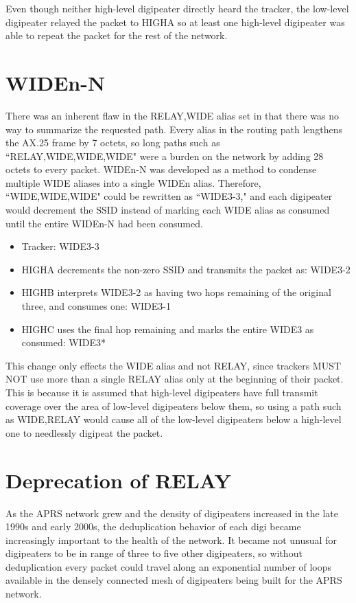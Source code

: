 Even though neither high-level digipeater directly heard the tracker,
the low-level digipeater relayed the packet to HIGHA so at least one high-level
digipeater was able to repeat the packet for the rest of the network.

\section{WIDEn-N}

There was an inherent flaw in the RELAY,WIDE alias set
in that there was no way to summarize the requested path.
Every alias in the routing path lengthens the AX.25 frame by 7 octets,
so long paths such as ``RELAY,WIDE,WIDE,WIDE" were a burden on the network
by adding 28 octets to every packet.
WIDEn-N was developed as a method to condense multiple WIDE aliases into a single WIDEn alias.
Therefore, ``WIDE,WIDE,WIDE" could be rewritten as ``WIDE3-3," and each digipeater would
decrement the SSID instead of marking each WIDE alias as consumed until the entire WIDEn-N had
been consumed.

\begin{itemize}
	\item Tracker: WIDE3-3
	\item HIGHA decrements the non-zero SSID and transmits the packet as: WIDE3-2
	\item HIGHB interprets WIDE3-2 as having two hops remaining of the original three, 
		and consumes one: WIDE3-1
	\item HIGHC uses the final hop remaining and marks the entire WIDE3 as consumed: WIDE3*
\end{itemize}

This change only effects the WIDE alias and not RELAY,
since trackers MUST NOT use more than a single RELAY alias only at the beginning of their packet.
This is because it is assumed that high-level digipeaters have full transmit coverage over
the area of low-level digipeaters below them, so using a path such as WIDE,RELAY would
cause all of the low-level digipeaters below a high-level one to needlessly digipeat the packet.

\section{Deprecation of RELAY}

As the APRS network grew and the density of digipeaters increased in the late 1990s and early 2000s,
the deduplication behavior of each digi became increasingly important to the health of the network.
It became not unusual for digipeaters to be in range of three to five other digipeaters,
so without deduplication every packet could travel along an exponential number of
loops available in the densely connected mesh of digipeaters being built for the APRS network.

